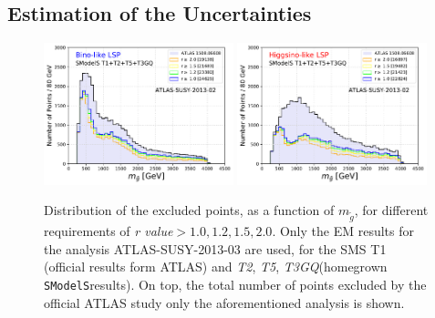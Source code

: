 \documentclass[preprint,number,sort&compress,twocolumn,3p]{elsstyarticle}
\newcommand{\SMO}{\texttt{SModelS\xspace}}
\newcommand{\MGLU}{$ m _{ \tilde g } $\xspace}
\newcommand{\RVALUE}{\textit{r value}}
\newcommand{\TGQ}{ \textit{T3GQ}}
\newcommand{\Ttwo}{ \textit{T2}}
\newcommand{\Tfive}{ \textit{T5}}
\begin{document}
\subsection{Estimation of the Uncertainties}\label{estimation}
\begin{figure}[!h]
	\begin{center}
		\subfigure
		{\includegraphics[width=0.49\textwidth]{PLOTS/Combination/Bino_TOT_GLU_Histo_rValue.pdf}}
		\subfigure
		{\includegraphics[width=0.49\textwidth]{PLOTS/Combination/Higgsino_TOT_GLU_Histo_rValue.pdf}}
	\end{center}
	\caption{Distribution of the excluded points, as a function of \MGLU, for different requirements of \RVALUE$>1.0,1.2,1.5,2.0$. Only the EM results for the analysis ATLAS-SUSY-2013-03 are used, for the SMS T1 (official results form ATLAS) and \Ttwo,\Tfive,\TGQ (homegrown \SMO results). On top, the total number of points excluded by the official ATLAS study only the aforementioned analysis is shown. } 
	\label{unc}
\end{figure}
\end{document}
